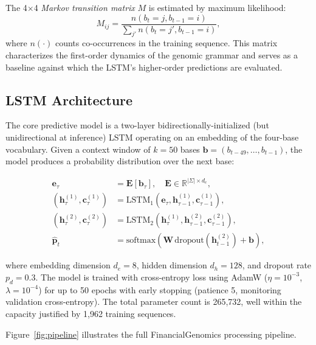 \documentclass[11pt]{article}
\begin{document}
The 4$\times$4 \emph{Markov transition matrix} $M$ is estimated by
maximum likelihood:
\begin{equation}
M_{ij} = \frac{n(b_t = j, b_{t-1} = i)}{\sum_{j'} n(b_t = j', b_{t-1} = i)},
\label{eq:markov}
\end{equation}
where $n(\cdot)$ counts co-occurrences in the training sequence.  This
matrix characterizes the first-order dynamics of the genomic grammar
and serves as a baseline against which the LSTM's higher-order
predictions are evaluated.

\subsection{LSTM Architecture}

The core predictive model is a two-layer bidirectionally-initialized
(but unidirectional at inference) LSTM \citep{hochreiter1997long}
operating on an embedding of the four-base vocabulary.  Given a context
window of $k = 50$ bases $\mathbf{b} = (b_{t-49}, \ldots, b_{t-1})$,
the model produces a probability distribution over the next base:

\begin{align}
\mathbf{e}_\tau &= \mathbf{E}[\mathbf{b}_\tau], \quad \mathbf{E} \in \mathbb{R}^{|\Sigma| \times d_e}, \\
(\mathbf{h}_\tau^{(1)}, \mathbf{c}_\tau^{(1)}) &= \text{LSTM}_1(\mathbf{e}_\tau, \mathbf{h}_{\tau-1}^{(1)}, \mathbf{c}_{\tau-1}^{(1)}), \\
(\mathbf{h}_\tau^{(2)}, \mathbf{c}_\tau^{(2)}) &= \text{LSTM}_2(\mathbf{h}_\tau^{(1)}, \mathbf{h}_{\tau-1}^{(2)}, \mathbf{c}_{\tau-1}^{(2)}), \\
\hat{\mathbf{p}}_t &= \text{softmax}(\mathbf{W}\, \text{dropout}(\mathbf{h}_{t-1}^{(2)}) + \mathbf{b}),
\end{align}

where embedding dimension $d_e = 8$, hidden dimension $d_h = 128$, and
dropout rate $p_d = 0.3$.  The model is trained with cross-entropy loss
using AdamW \citep{loshchilov2019decoupled} ($\eta = 10^{-3}$,
$\lambda = 10^{-4}$) for up to 50 epochs with early stopping
(patience 5, monitoring validation cross-entropy).  The total parameter
count is 265,732, well within the capacity justified by 1,962 training
sequences.

Figure~\ref{fig:pipeline} illustrates the full FinancialGenomics
processing pipeline.
\end{document}

